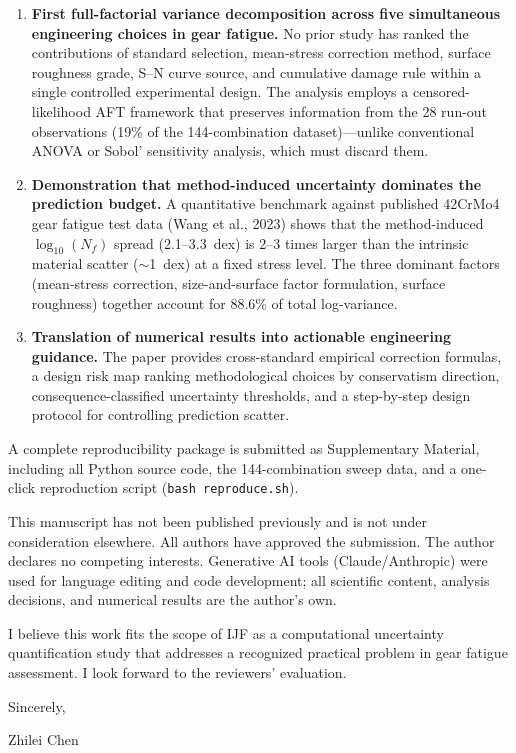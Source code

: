 \documentclass[12pt,a4paper]{article}
\begin{document}
\begin{enumerate}
  \item \textbf{First full-factorial variance decomposition across five
    simultaneous engineering choices in gear fatigue.} No prior study
    has ranked the contributions of standard selection, mean-stress
    correction method, surface roughness grade, S--N curve source, and
    cumulative damage rule within a single controlled experimental
    design. The analysis employs a censored-likelihood AFT framework
    that preserves information from the 28 run-out observations
    (19\% of the 144-combination dataset)---unlike conventional ANOVA
    or Sobol' sensitivity analysis, which must discard them.
  \item \textbf{Demonstration that method-induced uncertainty dominates
    the prediction budget.} A quantitative benchmark against published
    42CrMo4 gear fatigue test data (Wang et al., 2023) shows that the
    method-induced $\log_{10}(N_f)$ spread (2.1--3.3~dex) is 2--3
    times larger than the intrinsic material scatter ($\sim$1~dex) at
    a fixed stress level. The three dominant factors (mean-stress
    correction, size-and-surface factor formulation, surface roughness)
    together account for 88.6\% of total log-variance.
  \item \textbf{Translation of numerical results into actionable
    engineering guidance.} The paper provides cross-standard empirical
    correction formulas, a design risk map ranking methodological
    choices by conservatism direction, consequence-classified
    uncertainty thresholds, and a step-by-step design protocol for
    controlling prediction scatter.
\end{enumerate}

A complete reproducibility package is submitted as Supplementary
Material, including all Python source code, the 144-combination sweep
data, and a one-click reproduction script (\texttt{bash reproduce.sh}).

This manuscript has not been published previously and is not under
consideration elsewhere. All authors have approved the submission. The
author declares no competing interests. Generative AI tools
(Claude/Anthropic) were used for language editing and code
development; all scientific content, analysis decisions, and numerical
results are the author's own.

I believe this work fits the scope of IJF as a computational
uncertainty quantification study that addresses a recognized practical
problem in gear fatigue assessment. I look forward to the reviewers'
evaluation.

\vspace{0.5cm}

\noindent Sincerely,

\vspace{0.5cm}

\noindent Zhilei Chen
\end{document}
